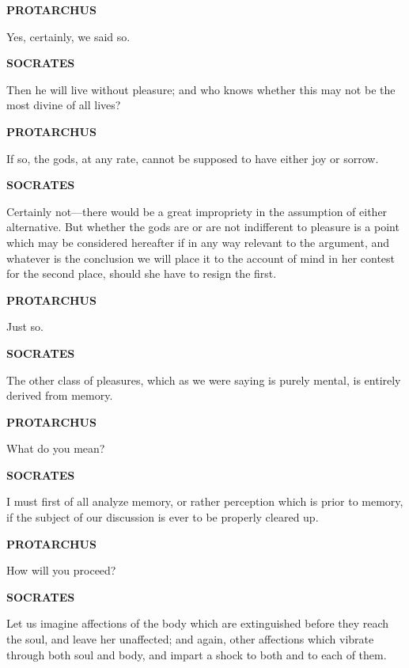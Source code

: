 \documentclass[11pt,letter]{article}
\begin{document}
\par \textbf{PROTARCHUS}
\par   Yes, certainly, we said so.

\par \textbf{SOCRATES}
\par   Then he will live without pleasure; and who knows whether this may not be the most divine of all lives?

\par \textbf{PROTARCHUS}
\par   If so, the gods, at any rate, cannot be supposed to have either joy or sorrow.

\par \textbf{SOCRATES}
\par   Certainly not—there would be a great impropriety in the assumption of either alternative. But whether the gods are or are not indifferent to pleasure is a point which may be considered hereafter if in any way relevant to the argument, and whatever is the conclusion we will place it to the account of mind in her contest for the second place, should she have to resign the first.

\par \textbf{PROTARCHUS}
\par   Just so.

\par \textbf{SOCRATES}
\par   The other class of pleasures, which as we were saying is purely mental, is entirely derived from memory.

\par \textbf{PROTARCHUS}
\par   What do you mean?

\par \textbf{SOCRATES}
\par   I must first of all analyze memory, or rather perception which is prior to memory, if the subject of our discussion is ever to be properly cleared up.

\par \textbf{PROTARCHUS}
\par   How will you proceed?

\par \textbf{SOCRATES}
\par   Let us imagine affections of the body which are extinguished before they reach the soul, and leave her unaffected; and again, other affections which vibrate through both soul and body, and impart a shock to both and to each of them.
\end{document}
